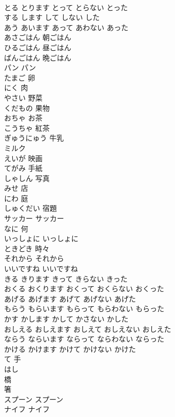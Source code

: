\documentclass[8pt]{extreport}
\begin{document}
\begin{CJK}{UTF8}{min}
\\	とる	とります	とって	とらない	とった	
\\	する	します	して	しない	した	
\\	あう	あいます	あって	あわない	あった	
\\	あさごはん	朝ごはん
\\	ひるごはん	昼ごはん
\\	ばんごはん	晩ごはん
\\	パン	パン
\\	たまご	卵
\\	にく	肉
\\	やさい	野菜
\\	くだもの	果物
\\	おちゃ	お茶
\\	こうちゃ	紅茶
\\	ぎゅうにゅう	牛乳
\\	ミルク	
\\	えいが	映画
\\	てがみ	手紙
\\	しゃしん	写真
\\	みせ	店
\\	にわ	庭
\\	しゅくだい	宿題
\\	サッカー	サッカー
\\	なに	何
\\	いっしょに	いっしょに
\\	ときどき	時々
\\	それから	それから
\\	いいですね	いいですね
\\	きる	きります	きって	きらない	きった	
\\	おくる	おくります	おくって	おくらない	おくった	
\\	あげる	あげます	あげて	あげない	あげた	
\\	もらう	もらいます	もらって	もらわない	もらった	
\\	かす	かします	かして	かさない	かした	
\\	おしえる	おしえます	おしえて	おしえない	おしえた	
\\	ならう	ならいます	ならって	ならわない	ならった	
\\	かける	かけます	かけて	かけない	かけた	
\\	て	手
\\	はし	
\\	橋 
\\	箸
\\	スプーン	スプーン
\\	ナイフ	ナイフ

\end{CJK}
\end{document}
